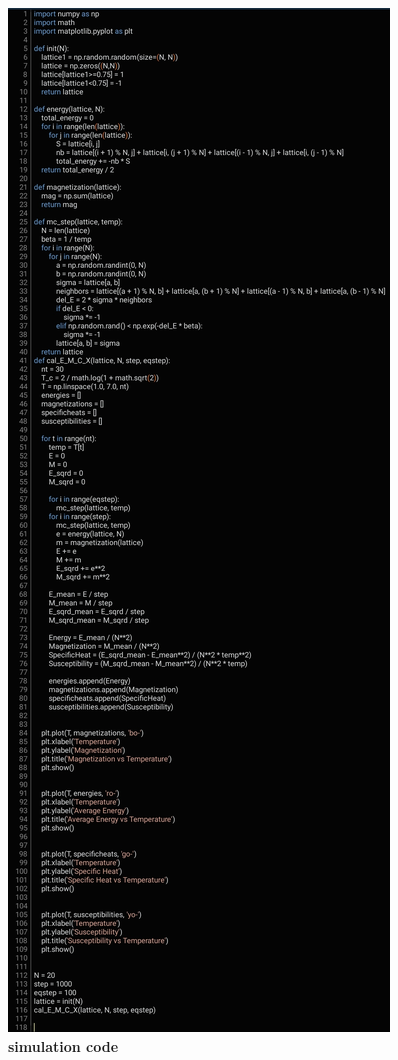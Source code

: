 \documentclass{article}
\begin{document}
\clearpage %

    
\begin{figure}
    \centering
    \includegraphics[width=0.5\linewidth]{IMG_20231125_233350.jpg}
    \caption{\textbf{simulation code}}
    
    
\end{figure}
 
\end{document}
